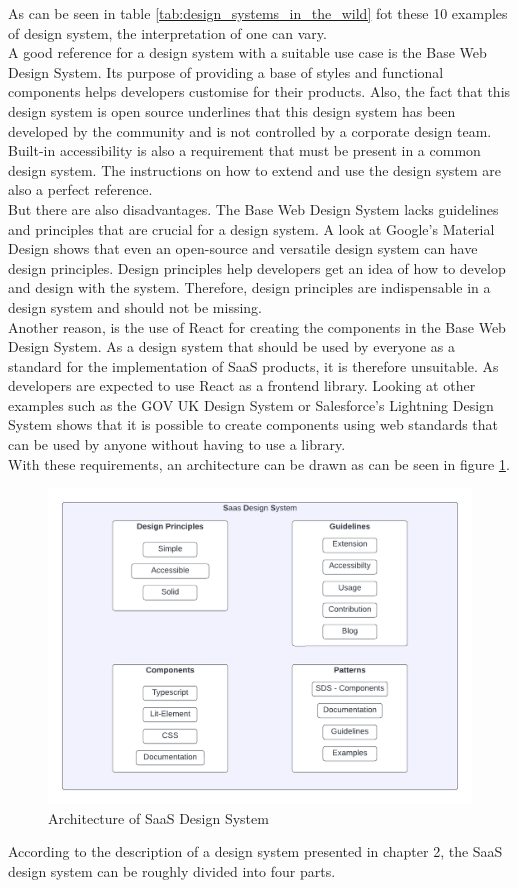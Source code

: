 As can be seen in table \ref{tab:design_systems_in_the_wild} fot these 10 examples of design system, the interpretation of one can vary. \\
A good reference for a design system with a suitable use case is the Base Web Design System. Its purpose of providing a base of styles and functional components helps developers customise for their products. Also, the fact that this design system is open source underlines that this design system has been developed by the community and is not controlled by a corporate design team. Built-in accessibility is also a requirement that must be present in a common design system. The instructions on how to extend and use the design system are also a perfect reference. \\
But there are also disadvantages. The Base Web Design System lacks guidelines and principles that are crucial for a design system. A look at Google's Material Design shows that even an open-source and versatile design system can have design principles. Design principles help developers get an idea of how to develop and design with the system. Therefore, design principles are indispensable in a design system and should not be missing. \\ \newpage
Another reason, is the use of React for creating the components in the Base Web Design System. As a design system that should be used by everyone as a standard for the implementation of SaaS products, it is therefore unsuitable. As developers are expected to use React as a frontend library. Looking at other examples such as the GOV UK Design System or Salesforce's Lightning Design System shows that it is possible to create components using web standards that can be used by anyone without having to use a library. \\
With these requirements, an architecture can be drawn as can be seen in figure \ref{architecture_sds}. \\
\begin{figure}[htbp]
\centerline{\includegraphics[width=\linewidth]{images/architecture_sds.png}}
\caption{Architecture of SaaS Design System}
\label{architecture_sds}
\end{figure}
According to the description of a design system presented in chapter 2, the SaaS design system can be roughly divided into four parts.
